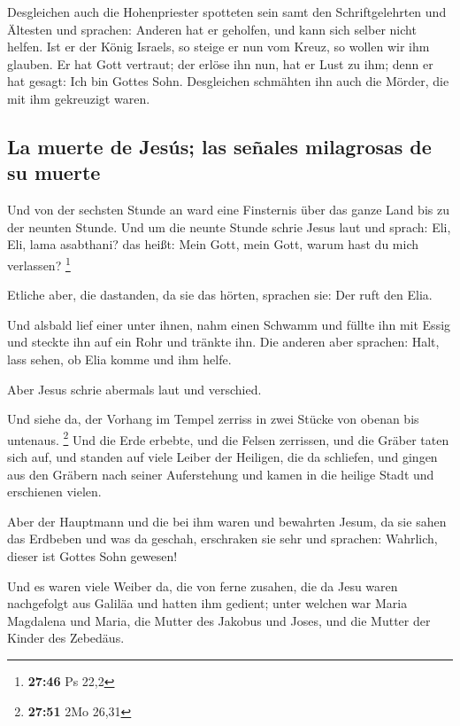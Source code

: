  Desgleichen auch die Hohenpriester spotteten sein samt
den Schriftgelehrten und Ältesten und sprachen:  Anderen
hat er geholfen, und kann sich selber nicht helfen. Ist er der König
Israels, so steige er nun vom Kreuz, so wollen wir ihm glauben.
 Er hat Gott vertraut; der erlöse ihn nun, hat er Lust zu
ihm; denn er hat gesagt: Ich bin Gottes Sohn. 
Desgleichen schmähten ihn auch die Mörder, die mit ihm gekreuzigt waren.

\hypertarget{la-muerte-de-jesuxfas-las-seuxf1ales-milagrosas-de-su-muerte}{%
\subsection{La muerte de Jesús; las señales milagrosas de su
muerte}\label{la-muerte-de-jesuxfas-las-seuxf1ales-milagrosas-de-su-muerte}}

 Und von der sechsten Stunde an ward eine Finsternis über
das ganze Land bis zu der neunten Stunde.  Und um die
neunte Stunde schrie Jesus laut und sprach: Eli, Eli, lama asabthani?
das heißt: Mein Gott, mein Gott, warum hast du mich verlassen?
\footnote{\textbf{27:46} Ps 22,2}

 Etliche aber, die dastanden, da sie das hörten, sprachen
sie: Der ruft den Elia.

 Und alsbald lief einer unter ihnen, nahm einen Schwamm
und füllte ihn mit Essig und steckte ihn auf ein Rohr und tränkte ihn.
 Die anderen aber sprachen: Halt, lass sehen, ob Elia
komme und ihm helfe.

 Aber Jesus schrie abermals laut und verschied.

 Und siehe da, der Vorhang im Tempel zerriss in zwei
Stücke von obenan bis untenaus. \footnote{\textbf{27:51} 2Mo 26,31}
 Und die Erde erbebte, und die Felsen zerrissen, und die
Gräber taten sich auf, und standen auf viele Leiber der Heiligen, die da
schliefen,  und gingen aus den Gräbern nach seiner
Auferstehung und kamen in die heilige Stadt und erschienen vielen.

 Aber der Hauptmann und die bei ihm waren und bewahrten
Jesum, da sie sahen das Erdbeben und was da geschah, erschraken sie sehr
und sprachen: Wahrlich, dieser ist Gottes Sohn gewesen!

 Und es waren viele Weiber da, die von ferne zusahen, die
da Jesu waren nachgefolgt aus Galiläa und hatten ihm gedient;
 unter welchen war Maria Magdalena und Maria, die Mutter
des Jakobus und Joses, und die Mutter der Kinder des Zebedäus.

